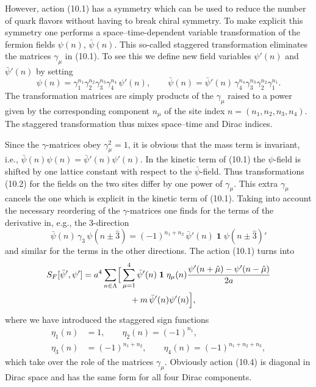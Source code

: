 However, action (10.1) has a symmetry which can be used to reduce the number
of quark flavors without having to break chiral symmetry. To make explicit
this symmetry one performs a space--time-dependent variable transformation of
the fermion fields $\psi(n)$, $\bar\psi(n)$. This so-called staggered
transformation eliminates the matrices $\gamma_\mu$ in (10.1). To see this we
define new field variables $\psi'(n)$ and $\bar\psi'(n)$ by setting
\begin{equation}
  \psi(n) = \gamma_1^{n_1}\gamma_2^{n_2}\gamma_3^{n_3}\gamma_4^{n_4}
  \,\psi'(n) , \qquad
  \bar\psi(n) = \bar\psi'(n)\,
  \gamma_4^{n_4}\gamma_3^{n_3}\gamma_2^{n_2}\gamma_1^{n_1} .
\end{equation}
The transformation matrices are simply products of the $\gamma_\mu$ raised to
a power given by the corresponding component $n_\mu$ of the site index
$n = (n_1, n_2, n_3, n_4)$. The staggered transformation thus mixes
space--time and Dirac indices.

Since the $\gamma$-matrices obey $\gamma_\mu^2 = 1$, it is obvious that the
mass term is invariant, i.e., $\bar\psi(n)\psi(n) = \bar\psi'(n)\psi'(n)$. In
the kinetic term of (10.1) the $\psi$-field is shifted by one lattice constant
with respect to the $\bar\psi$-field. Thus transformations (10.2) for the
fields on the two sites differ by one power of $\gamma_\mu$. This extra
$\gamma_\mu$ cancels the one which is explicit in the kinetic term of (10.1).
Taking into account the necessary reordering of the $\gamma$-matrices one
finds for the terms of the derivative in, e.g., the 3-direction
\begin{equation}
  \bar\psi(n)\, \gamma_3\, \psi(n \pm \hat{3})
  = (-1)^{n_1 + n_2}\, \bar\psi'(n)\; \mathbf{1} \;
  \psi(n \pm \hat{3})'
\end{equation}
and similar for the terms in the other directions. The action (10.1) turns
into
\begin{equation}
  \begin{split}
    S_F[\bar\psi', \psi'] = a^4 \sum_{n\in\Lambda}
    \Bigl[ &\sum_{\mu=1}^{4} \bar\psi'(n)\; \mathbf{1} \;
      \eta_\mu(n) \frac{\psi'(n+\hat\mu) - \psi'(n-\hat\mu)}{2a}\\
    &\quad + m\,\bar\psi'(n)\psi'(n)
    \Bigr] ,
  \end{split}
\end{equation}
where we have introduced the staggered sign functions
\begin{equation}
  \begin{aligned}
    \eta_1(n) &= 1 , \qquad \eta_2(n) = (-1)^{n_1} , \\
    \eta_3(n) &= (-1)^{n_1 + n_2} , \qquad
    \eta_4(n) = (-1)^{n_1 + n_2 + n_3} ,
  \end{aligned}
\end{equation}
which take over the role of the matrices $\gamma_\mu$. Obviously action (10.4)
is diagonal in Dirac space and has the same form for all four Dirac
components.

